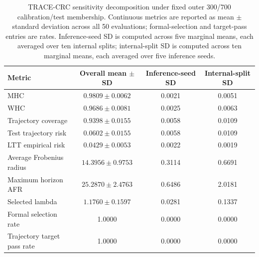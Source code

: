 \begin{table}[!htbp]
\centering
\scriptsize
\caption{TRACE-CRC sensitivity decomposition under fixed outer 300/700 calibration/test membership. Continuous metrics are reported as mean $\pm$ standard deviation across all 50 evaluations; formal-selection and target-pass entries are rates. Inference-seed SD is computed across five marginal means, each averaged over ten internal splits; internal-split SD is computed across ten marginal means, each averaged over five inference seeds.}
\label{tab:trace-internal-factor-sensitivity}
\begin{tabular}{lccc}
\toprule
Metric & Overall mean $\pm$ SD & Inference-seed SD & Internal-split SD \\
\midrule
MHC & $0.9809 \pm 0.0062$ & 0.0021 & 0.0051 \\
WHC & $0.9686 \pm 0.0081$ & 0.0025 & 0.0063 \\
Trajectory coverage & $0.9398 \pm 0.0155$ & 0.0058 & 0.0109 \\
Test trajectory risk & $0.0602 \pm 0.0155$ & 0.0058 & 0.0109 \\
LTT empirical risk & $0.0429 \pm 0.0053$ & 0.0022 & 0.0019 \\
Average Frobenius radius & $14.3956 \pm 0.9753$ & 0.3114 & 0.6691 \\
Maximum horizon AFR & $25.2870 \pm 2.4763$ & 0.6486 & 2.0181 \\
Selected lambda & $1.1760 \pm 0.1597$ & 0.0281 & 0.1337 \\
Formal selection rate & 1.0000 & 0.0000 & 0.0000 \\
Trajectory target pass rate & 1.0000 & 0.0000 & 0.0000 \\
\bottomrule
\end{tabular}
\end{table}
